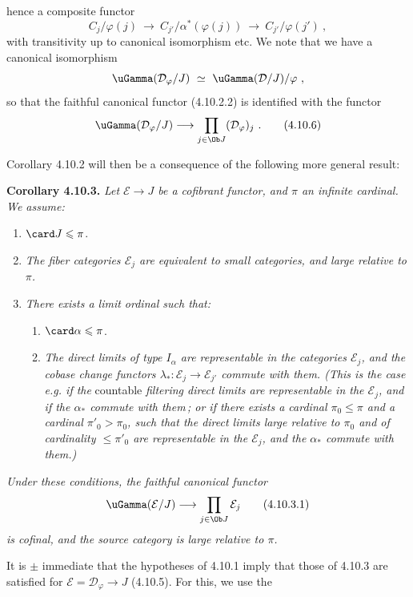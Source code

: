 
hence a composite functor
\[
C_j/\varphi(j) \ \longrightarrow \ C_{j'}/\alpha^*(\varphi(j)) \ \longrightarrow \ C_{j'}/\varphi(j') \ ,
\]
with transitivity up to canonical isomorphism etc. We note that we have a canonical isomorphism
\[
\uGamma(\mathcal{D}_\varphi/J) \ \simeq \ \uGamma(\mathcal{D}/J)/\varphi \ ,
\]
so that the faithful canonical functor (4.10.2.2) is identified with the functor
\[
\uGamma(\mathcal{D}_\varphi/J) \longrightarrow \prod_{j\in\Ob J} (\mathcal{D}_\varphi)_j \ . \tag*{(4.10.6)}
\]

Corollary 4.10.2 will then be a consequence of the following more general result:

\textbf{Corollary 4.10.3.} \textit{Let $\mathcal{E} \longrightarrow J$ be a cofibrant functor, and $\pi$ an infinite cardinal. We assume:}
\begin{enumerate}[label={}, leftmargin=3em]
\item[\textit{a)}] $\card J \leqslant \pi$.
\item[\textit{b)}] \textit{The fiber categories $\mathcal{E}_j$ are equivalent to small categories, and large relative to $\pi$.}
\item[\textit{c)}] \textit{There exists a limit ordinal such that:}
\begin{enumerate}[label={}, leftmargin=3em]
\item[\textit{1°)}] $\card \alpha \leqslant \pi$.
\item[\textit{2°)}] \textit{The direct limits of type $I_\alpha$ are representable in the categories $\mathcal{E}_j$, and the cobase change functors $\lambda_* : \mathcal{E}_j \longrightarrow \mathcal{E}_{j'}$ commute with them. (This is the case e.g. if the} countable \textit{filtering direct limits are representable in the $\mathcal{E}_j$, and if the $\alpha_*$ commute with them\,; or if there exists a cardinal $\pi_0 \leqslant \pi$ and a cardinal $\pi'_0 > \pi_0$, such that the direct limits large relative to $\pi_0$ and of cardinality $\leqslant \pi'_0$ are representable in the $\mathcal{E}_j$, and the $\alpha_*$ commute with them.)}
\end{enumerate}
\end{enumerate}
\textit{Under these conditions, the faithful canonical functor}
\[
\uGamma(\mathcal{E}/J) \longrightarrow \prod_{j\in\Ob J} \mathcal{E}_j \tag*{(4.10.3.1)}
\]
\textit{is cofinal, and the source category is large relative to $\pi$.}

It is $\pm$ immediate that the hypotheses of 4.10.1 imply that those of 4.10.3 are satisfied for $\mathcal{E} = \mathcal{D}_\varphi \longrightarrow J$ (4.10.5). For
this, we use the

